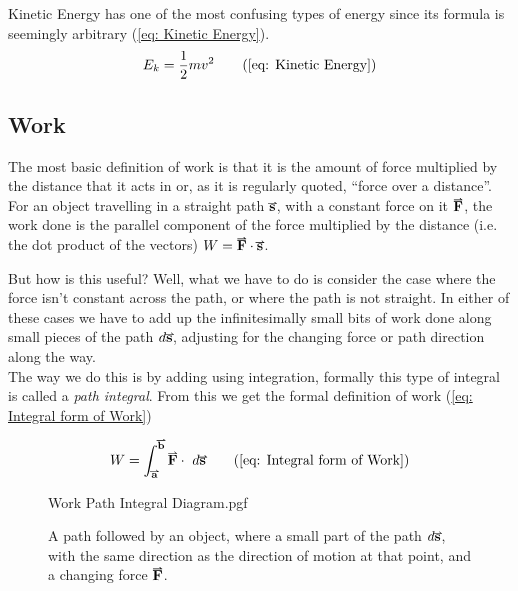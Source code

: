 \documentclass[main.tex]{subfiles}
\begin{document}
                    Kinetic Energy has one of the most confusing types of energy since its formula is seemingly arbitrary (\eqref{eq: Kinetic Energy}).
                    \begin{equation*}
                        E_k = \frac{1}{2}mv^2
                        \tag{\eqnum{eq: Kinetic Energy}}
                    \end{equation*}
                
                \subsection{Work}
                    \label{subsec: Work}

                    The most basic definition of work is that it is the amount of force multiplied by the distance that it acts in or, as it is regularly quoted, ``force over a distance''. For an object travelling in a straight path $\vect{s}$, with a constant force on it $\vect{F}$, the work done is the parallel component of the force multiplied by the distance (i.e. the dot product of the vectors) $W = \vect{F} \cdot \vect{s}$.

                    But how is this useful? Well, what we have to do is consider the case where the force isn't constant across the path, or where the path is not straight. In either of these cases we have to add up the infinitesimally small bits of work done along small pieces of the path $d\vect{s}$, adjusting for the changing force or path direction along the way.\\
                    The way we do this is by adding using integration, formally this type of integral is called a \textit{path integral}. From this we get the formal definition of work (\eqref{eq: Integral form of Work})

                    \begin{equation*}
                        W = \int_{\vect{a}}^{\vect{b}} \vect{F} \cdot \ud \vect{s}
                        \tag{\eqnum{eq: Integral form of Work}}
                    \end{equation*}

                    \begin{figure}[h]
                        \centering
                        \scalebox{0.8}
                        {
                            \begin{adjustbox}{clip,trim=20mm 20mm 20mm 40mm}
                                {{Work Path Integral Diagram.pgf}}
                            \end{adjustbox}
                        }
                        \captionsetup{singlelinecheck=off}
                        \caption[.]{A path followed by an object, where a small part of the path $d\vect{s}$, with the same direction as the direction of motion at that point, and a changing force $\vect{F}$.}
                        \label{fig: Work Path Integral}
                    \end{figure}
                    \FloatBarrier
\end{document}
